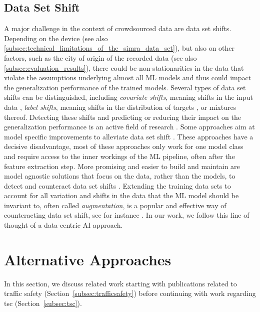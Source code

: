 \subsection{Data Set Shift}
\label{subsec:data_set_shift}
A major challenge in the context of crowdsourced data are data set shifts.
Depending on the device (see also \autoref{subsec:technical_limitations_of_the_simra_data_set}), but also on other factors, such as the city of origin of the recorded data (see also \autoref{subsec:evaluation_results}), there could be non-stationarities in the data that violate the assumptions underlying almost all ML models and thus could impact the generalization performance of the trained models.
Several types of data set shifts can be distinguished, including \textit{covariate shifts}, meaning shifts in the input data \cite{sugiyama_machine_2012}, \textit{label shifts}, meaning shifts in the distribution of targets \cite{lipton_detecting_2018}, or mixtures thereof.
Detecting these shifts \cite{polyzotis_data_2018, rabanser_failing_2018, breck_data_2019, abdar_review_2021, bates_testing_2021} and predicting \cite{schelter_learning_2020} or reducing their impact on the generalization performance is an active field of research \cite{schelter_challenges_2018, biessmann_automated_2021}.
Some approaches aim at model specific improvements to alleviate data set shift \cite{sugiyama_machine_2012}. These approaches have a decisive disadvantage, most of these approaches only work for one model class and require access to the inner workings of the ML pipeline, often after the feature extraction step.
More promising and easier to build and maintain are model agnostic solutions that focus on the data, rather than the models, to detect and counteract data set shifts \cite{biessmann_automated_2021}.
Extending the training data sets to account for all variation and shifts in the data that the ML model should be invariant to, often called \textit{augmentation}, is a popular and effective way of counteracting data set shift, see for instance \cite{cubuk_autoaugment_2019}.
In our work, we follow this line of thought of a data-centric AI approach.


\section{Alternative Approaches}
\label{sec:related_work_cyclesense}
In this section, we discuss related work starting with publications related to traffic safety (Section~\ref{subsec:trafficsafety}) before continuing with work regarding \acl{tsc} (Section~\ref{subsec:tsc}).

